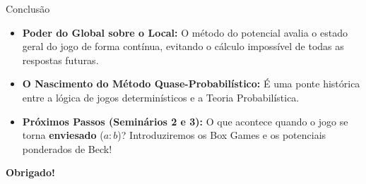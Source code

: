 \documentclass[11pt, aspectratio=169]{beamer}
\begin{document}
\begin{frame}{Conclusão}
    \begin{itemize}
        \item \textbf{Poder do Global sobre o Local:} O método do potencial avalia o estado geral do jogo de forma contínua, evitando o cálculo impossível de todas as respostas futuras.
        \item \textbf{O Nascimento do Método Quase-Probabilístico:} É uma ponte histórica entre a lógica de jogos determinísticos e a Teoria Probabilística.
        \item \textbf{Próximos Passos (Seminários 2 e 3):} O que acontece quando o jogo se torna \textbf{enviesado} ($a:b$)? Introduziremos os Box Games e os potenciais ponderados de Beck!
    \end{itemize}
    
    \vspace{1cm}
    \begin{center}
        \textbf{Obrigado!}
    \end{center}
\end{frame}
\end{document}
